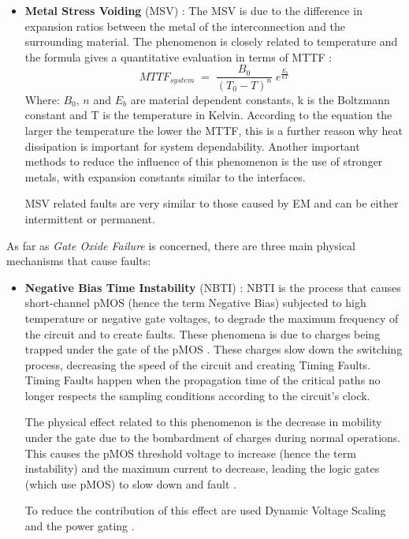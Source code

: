 {{{\begin{itemize}
				\item \textbf{Metal Stress Voiding} (MSV) :  The MSV is due to the difference in expansion ratios between the metal of the interconnection and the surrounding material. The phenomenon is closely related to temperature and the formula  gives a quantitative evaluation in terms of MTTF :
				\begin{equation} \label{MTTF_MSV}
					MTTF_{system} \;=\; \frac{B_0}{(T_0-T)^n}\;e^{\frac{E_b}{kT}} 
				\end{equation}
				Where:  $B_0$, $n$ and $E_b$ are material dependent constants, k is the Boltzmann constant and T is the temperature in Kelvin. According to the equation the larger the temperature the lower the MTTF, this is a further reason why heat dissipation is important for system dependability. Another important methods to reduce the influence of this phenomenon is the use of stronger metals, with expansion constants similar to the interfaces.

				MSV related faults are very similar to those caused by EM and can be either intermittent or permanent.
			\end{itemize}
		
			
			As far as \textit{Gate Oxide Failure} is concerned, there are three main physical mechanisms that cause faults:
			\begin{itemize}
				\item \textbf{Negative Bias Time Instability} (NBTI) : NBTI is the process that causes short-channel pMOS (hence the term Negative Bias) subjected to high temperature or negative gate voltages, to degrade the maximum frequency of the circuit and to create faults. These phenomena is due to charges being trapped under the gate of the pMOS  .
				These charges slow down the switching process, decreasing the speed of the circuit and creating Timing Faults. Timing Faults happen when the propagation time of the critical paths no longer respects the sampling conditions according to the circuit's clock. 
				
				The physical effect related to this phenomenon is the decrease in mobility under the gate due to the bombardment of charges during normal operations. This causes the pMOS threshold voltage to increase (hence the term instability) and the maximum current to decrease, leading the logic gates (which use pMOS) to slow down and fault .
				
				To reduce the contribution of this effect are used Dynamic Voltage Scaling and the power gating .
				

\end{itemize}}}}

